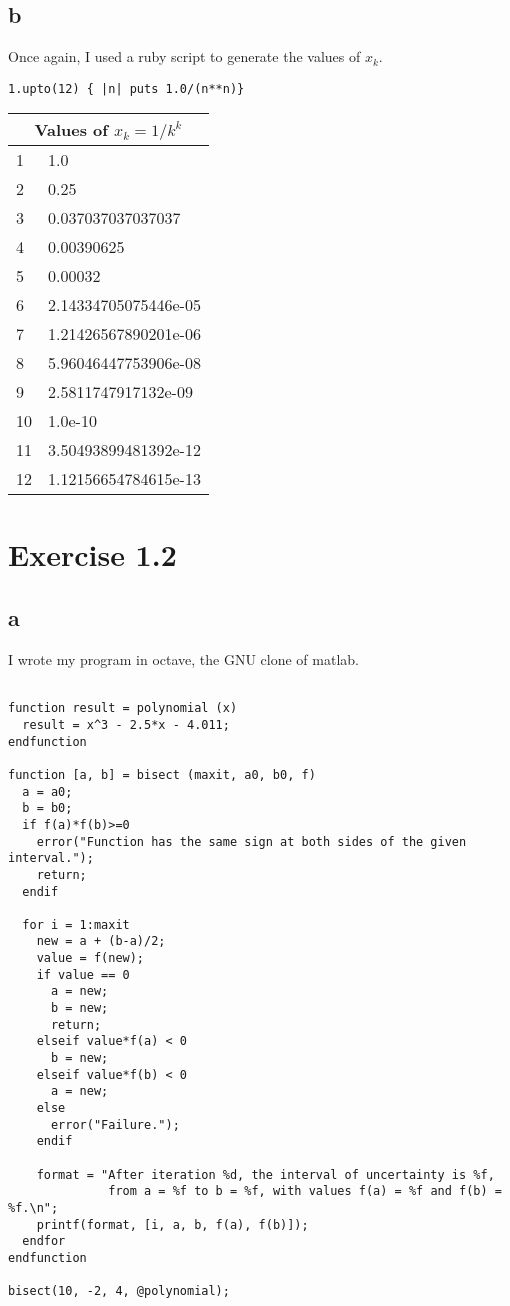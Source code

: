 \documentclass[11pt]{amsart}
\begin{document}
\subsection{b}
Once again, I used a ruby script to generate the values of $x_{k}$. \\
\begin{verbatim}
1.upto(12) { |n| puts 1.0/(n**n)}
\end{verbatim}
\begin{tabular}{|l|l|}
    \hline
  \multicolumn{2}{|c|}{Values of $x_{k}=1/{k^{k}}$} \\
    \hline
  1 & 1.0 \\
    \hline
  2 & 0.25 \\
    \hline
  3 & 0.037037037037037 \\
    \hline
  4 & 0.00390625 \\
    \hline
  5 & 0.00032 \\
    \hline
  6 & 2.14334705075446e-05 \\
    \hline
  7 & 1.21426567890201e-06 \\
    \hline
  8 & 5.96046447753906e-08 \\
    \hline
  9 & 2.5811747917132e-09 \\
    \hline
  10 & 1.0e-10 \\
    \hline
  11 & 3.50493899481392e-12 \\
    \hline
  12 & 1.12156654784615e-13 \\
    \hline

\end{tabular}
\newpage
\section{Exercise 1.2}
\subsection{a}
I wrote my program in octave, the GNU clone of matlab.
\begin{verbatim}

function result = polynomial (x)
  result = x^3 - 2.5*x - 4.011;
endfunction

function [a, b] = bisect (maxit, a0, b0, f)
  a = a0;
  b = b0;
  if f(a)*f(b)>=0
    error("Function has the same sign at both sides of the given interval.");
    return;
  endif

  for i = 1:maxit
    new = a + (b-a)/2;
    value = f(new);
    if value == 0
      a = new;
      b = new;
      return;
    elseif value*f(a) < 0
      b = new;
    elseif value*f(b) < 0
      a = new;
    else
      error("Failure.");
    endif 

    format = "After iteration %d, the interval of uncertainty is %f, 
              from a = %f to b = %f, with values f(a) = %f and f(b) = %f.\n";
    printf(format, [i, a, b, f(a), f(b)]);
  endfor
endfunction

bisect(10, -2, 4, @polynomial);
\end{verbatim}
\end{document}
